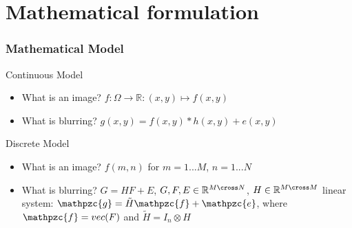 \section[Math. Formulat.]{Mathematical formulation}

\begin{frame}
	\frametitle{Mathematical Model}
	Continuous Model
	\begin{itemize}
	\item What is an image? $f:\Omega \rightarrow \mathbb{R}: (x,y) \mapsto f(x,y)$
	\item What is blurring? $g(x,y) = f(x,y) \ast h(x,y) + e(x,y)$
	\end{itemize}
	Discrete Model
	\begin{itemize}
	\item What is an image? $f(m,n)$ for $m=1...M$, $n=1...N$
	\item What is blurring? $G = HF + E$, $G,F,E \in \mathbb{R}^{M \cross N}$, $H \in \mathbb{R}^{M \cross M}$
	linear system: $\mathpzc{g} = \tilde{H}\mathpzc{f} + \mathpzc{e}$, where $\mathpzc{f} = vec(F)$ and $\tilde{H} = I_n \otimes H$
	\end{itemize}
\end{frame}
